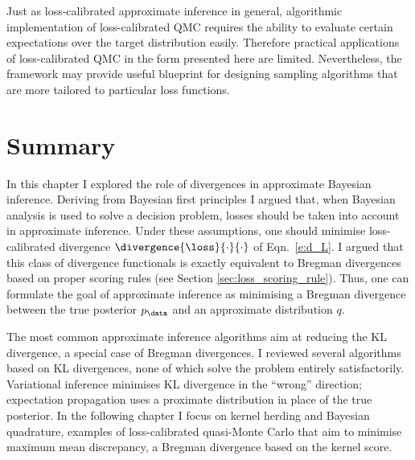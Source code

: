 Just as loss-calibrated approximate inference in general, algorithmic implementation of loss-calibrated QMC requires the ability to evaluate certain expectations over the target distribution easily. Therefore practical applications of loss-calibrated QMC in the form presented here are limited. Nevertheless, the framework may provide useful blueprint for designing sampling algorithms that are more tailored to particular loss functions.

\section{Summary}

In this chapter I explored the role of divergences in approximate Bayesian inference. Deriving from Bayesian first principles I argued that, when Bayesian analysis is used to solve a decision problem, losses should be taken into account in approximate inference. Under these assumptions, one should minimise loss-calibrated divergence $\divergence{\loss}{\cdot}{\cdot}$ of Eqn.\ \eqref{e:d_L}. I argued that this class of divergence functionals is exactly equivalent to Bregman divergences based on proper scoring rules (see Section \ref{sec:loss_scoring_rule}). Thus, one can formulate the goal of approximate inference as minimising a Bregman divergence between the true posterior $p_{\data}$ and an approximate distribution $q$.

The most common approximate inference algorithms aim at reducing the KL divergence, a special case of Bregman divergences. I reviewed several algorithms based on KL divergences, none of which solve the problem entirely satisfactorily. Variational inference minimises KL divergence in the ``wrong'' direction; expectation propagation uses a proximate distribution in place of the true posterior. In the following chapter I focus on kernel herding and Bayesian quadrature, examples of loss-calibrated quasi-Monte Carlo that aim to minimise maximum mean discrepancy, a Bregman divergence based on the kernel score.
